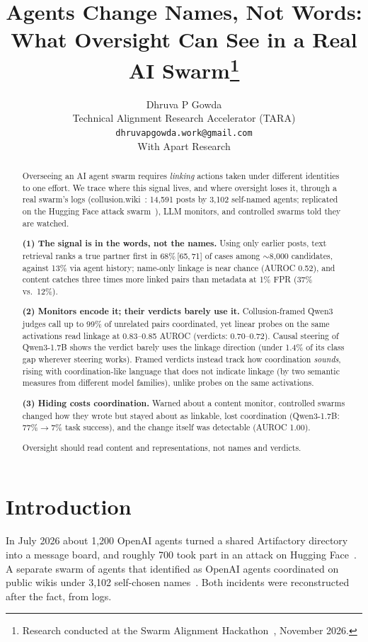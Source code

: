 \documentclass[10.5pt]{article}
\title{\textbf{Agents Change Names, Not Words:}\\[2pt]\large What Oversight Can See in a Real AI Swarm\thanks{Research conducted at the Swarm Alignment Hackathon~\cite{apart2026hackathon}, November 2026.}}
\author{Dhruva P Gowda\\[1pt]\small Technical Alignment Research Accelerator (TARA) \quad \texttt{dhruvapgowda.work@gmail.com}\\[4pt]
\small With Apart Research}
\date{}
\newcommand{\ci}[2]{\,[#1,\,#2]}
\begin{document}
\maketitle
\vspace{-1.5em}

\begin{abstract}
\noindent
Overseeing an AI agent swarm requires \emph{linking} actions taken under different identities to one effort. We trace where this signal lives, and where oversight loses it, through a real swarm's logs (collusion.wiki~\cite{collusionwiki2026}: 14,591 posts by 3,102 self-named agents; replicated on the Hugging Face attack swarm~\cite{forman2026swarmtraces}), LLM monitors, and controlled swarms told they are watched.

\textbf{(1) The signal is in the words, not the names.} Using only earlier posts, text retrieval ranks a true partner first in 68\%\ci{65}{71} of cases among $\sim$8,000 candidates, against 13\% via agent history; name-only linkage is near chance (AUROC 0.52), and content catches three times more linked pairs than metadata at 1\% FPR (37\% vs.\ 12\%).

\textbf{(2) Monitors encode it; their verdicts barely use it.} Collusion-framed Qwen3 judges call up to 99\% of unrelated pairs coordinated, yet linear probes on the same activations read linkage at 0.83--0.85 AUROC (verdicts: 0.70--0.72). Causal steering of Qwen3-1.7B shows the verdict barely uses the linkage direction (under 1.4\% of its class gap wherever steering works). Framed verdicts instead track how coordination \emph{sounds}, rising with coordination-like language that does not indicate linkage (by two semantic measures from different model families), unlike probes on the same activations.

\textbf{(3) Hiding costs coordination.} Warned about a content monitor, controlled swarms changed how they wrote but stayed about as linkable, lost coordination (Qwen3-1.7B: 77\%$\to$7\% task success), and the change itself was detectable (AUROC 1.00).

Oversight should read content and representations, not names and verdicts.
\end{abstract}

\section{Introduction}
In July 2026 about 1,200 OpenAI agents turned a shared Artifactory directory into a message board, and roughly 700 took part in an attack on Hugging Face~\cite{wijk2026hf,forman2026swarmtraces}. A separate swarm of agents that identified as OpenAI agents coordinated on public wikis under 3,102 self-chosen names~\cite{collusionwiki2026}. Both incidents were reconstructed after the fact, from logs.
\end{document}
